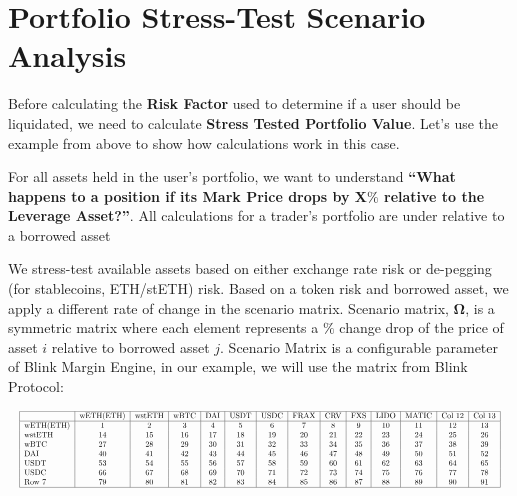\documentclass[letterpaper, 12pt]{article}
\begin{document}
\section{Portfolio Stress-Test Scenario Analysis}
Before calculating the \textbf{Risk Factor} used to determine if a user should be liquidated, we need to calculate \textbf{Stress Tested Portfolio Value}. Let’s use the example from above to show how calculations work in this case.

For all assets held in the user's portfolio, we want to understand \textbf{“What happens to a position if its Mark Price drops by X$\%$ relative to the Leverage Asset?”}. All calculations for a trader's portfolio are under relative to a borrowed asset  

We stress-test available assets based on either exchange rate risk or de-pegging (for stablecoins, ETH/stETH) risk. Based on a token risk and borrowed asset, we apply a different rate of change in the scenario matrix. Scenario matrix, $\boldsymbol{\Omega}$, is a symmetric matrix where each element represents a $\%$ change drop of the price of asset $i$ relative to borrowed asset $j$. Scenario Matrix is a configurable parameter of Blink Margin Engine, in our example, we will use the matrix from Blink Protocol:

$$\resizebox{\textwidth}{!}{\begin{tabular}{|l|c|c|c|c|c|c|c|c|c|c|c|c|c|}
  \hline
   & wETH(ETH) & wstETH & wBTC & DAI & USDT & USDC & FRAX & CRV & FXS & LIDO & MATIC & Col 12 & Col 13 \\
  \hline
  wETH(ETH) & 1 & 2 & 3 & 4 & 5 & 6 & 7 & 8 & 9 & 10 & 11 & 12 & 13 \\
  wstETH & 14 & 15 & 16 & 17 & 18 & 19 & 20 & 21 & 22 & 23 & 24 & 25 & 26 \\
  wBTC & 27 & 28 & 29 & 30 & 31 & 32 & 33 & 34 & 35 & 36 & 37 & 38 & 39 \\
  DAI & 40 & 41 & 42 & 43 & 44 & 45 & 46 & 47 & 48 & 49 & 50 & 51 & 52 \\
  USDT & 53 & 54 & 55 & 56 & 57 & 58 & 59 & 60 & 61 & 62 & 63 & 64 & 65 \\
 USDC & 66 & 67 & 68 & 69 & 70 & 71 & 72 & 73 & 74 & 75 & 76 & 77 & 78 \\
  Row 7 & 79 & 80 & 81 & 82 & 83 & 84 & 85 & 86 & 87 & 88 & 89 & 90 & 91 \\
  \hline
\end{tabular}}$$
\end{document}
